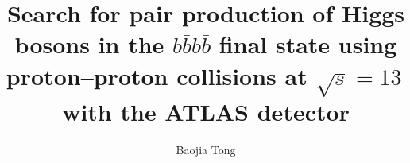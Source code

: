 \title{Search for pair production of Higgs bosons in the $b\bar{b}b\bar{b}$ final state using proton--proton collisions at $\sqrt{s} = 13$\,\TeV{} with the ATLAS detector}
\author{Baojia Tong}







